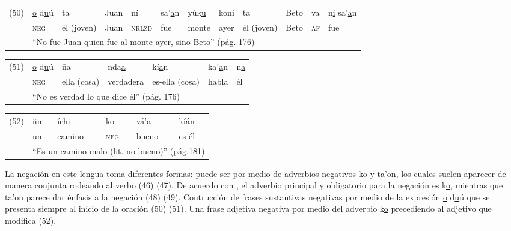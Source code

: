 {%
{\small
\begin{tabular}{llllllllllll}
 (50) & \underline{o} d\underline{u}ú & ta & Juan & ní & sa'\underline{a}n & yúk\underline{u} & koni & ta & Beto & va & n\underline{i} sa'\underline{a}n \\
 & \textsc{neg} & él (joven) & Juan & \textsc{nrlzd} & fue & monte & ayer & él (joven) & Beto & \textsc{af} & fue \\
 & \multicolumn{11}{l}{``No fue Juan quien fue al monte ayer, sino Beto'' (pág. 176)}
\end{tabular} \vspace{0.2cm}
}

\begin{tabular}{lllllll}
(51) & \underline{o} d\underline{u}ú & ña & nda\underline{a} & kí\underline{a}n & ka'\underline{a}n & n\underline{a} \\
& \textsc{neg} & ella (cosa) & verdadera & es-ella (cosa) & habla & él \\
& \multicolumn{6}{l}{``No es verdad lo que dice él'' (pág. 176)}
\end{tabular} \vspace{0.2cm}

\begin{tabular}{llllll}
(52) & iin & ích\underline{i} & k\underline{o} & vá'a & kíán \\
& un & camino & \textsc{neg} & bueno & es-él \\
& \multicolumn{5}{l}{``Es un camino malo (lit. no bueno)'' (pág.181)}
\end{tabular} \vspace{0.3cm}
}

La negación en este lengua toma diferentes formas: puede ser por medio de adverbios negativos {\setmainfont{Doulos SIL} k\underline{o} y ta'on}, los cuales suelen aparecer de manera conjunta rodeando al verbo (46) (47). De acuerdo con \textcolor{MidnightBlue}{\citet{Mixteco}}, el adverbio principal y obligatorio para la negación es {\setmainfont{Doulos SIL} k\underline{o}}, mientras que {\setmainfont{Doulos SIL} ta'on} parece dar énfasis a la negación (48) (49). Contrucción de frases sustantivas negativas por medio de la expresión {\setmainfont{Doulos SIL} \underline{o} d\underline{u}ú} que se presenta siempre al inicio de la oración (50) (51). Una frase adjetiva negativa por medio del adverbio {\setmainfont{Doulos SIL} k\underline{o}} precediendo al adjetivo que modifica (52).